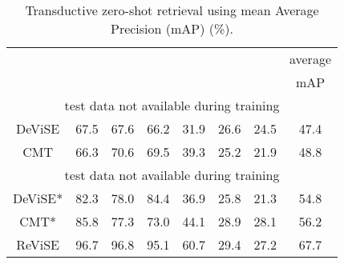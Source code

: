 {{\begin{table}[t!]
\centering
\caption{\footnotesize Transductive zero-shot retrieval using mean Average Precision (mAP) (\%).}
\vspace{1mm}
\scalebox{0.72}
{
\begin{tabular}{|c||lll||lll||c|}
\hline
 & \multicolumn{3}{c||}{}                                                      & \multicolumn{3}{c||}{}                                                     & average                          \\
                        & \multicolumn{1}{c}{} & \multicolumn{1}{c}{} & \multicolumn{1}{c||}{} & \multicolumn{1}{c}{} & \multicolumn{1}{c}{} & \multicolumn{1}{c||}{} & mAP \\ \hline\hline
\multicolumn{8}{|c|}{test data not available during training}                                                                                                                                                                                     \\ \hline \hline
DeViSE \cite{frome2013devise}                  &              67.5            &             67.6           &         66.2                 &            31.9             &           26.6              &           24.5               &        47.4              \\
CMT \cite{socher2013zero}                    &              66.3            &             70.6            &         69.5                 &             39.3            &             25.2            &           21.9              &     48.8                       \\ \hline \hline
\multicolumn{8}{|c|}{test data not available during training}                                                                                                                                                                                        \\ \hline \hline
DeViSE* \cite{frome2013devise}                &              82.3            &              78.0          &        84.4                  &             36.9            &            25.8             &             21.3             &       54.8               \\
CMT* \cite{socher2013zero}                   &              85.8            &             77.3            &       73.0                   &              44.1           &            28.9             &             28.1            &     56.2                     \\
ReViSE&            96.7              &            96.8             &         95.1          &     60.7             &       29.4           &        27.2        &            67.7            \\

\end{tabular}}
\end{table}}}
